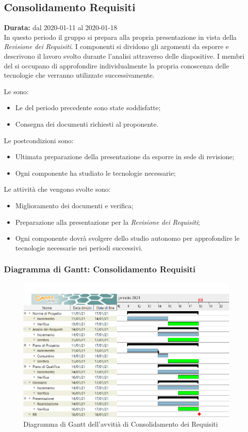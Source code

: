 \subsection{Consolidamento Requisiti}
\label{consolidamento_requisiti}
\textbf{Durata:} dal 2020-01-11 al 2020-01-18 \\
In questo periodo il gruppo si prepara alla propria presentazione in vista della \textit{Revisione dei Requisiti}.
I componenti si dividono gli argomenti da esporre e descrivono il lavoro svolto durante l'analisi attraverso delle diapositive.
I membri del  si occupano di approfondire individualmente la propria conoscenza delle tecnologie che verranno utilizzate successivamente.

Le  sono:
\begin{itemize}
    \item Le  del periodo precedente sono state soddisfatte;
    \item Consegna dei documenti richiesti al proponente.
\end{itemize}

Le postcondizioni sono:
\begin{itemize}
    \item Ultimata preparazione della presentazione da esporre in sede di revisione;
    \item Ogni componente ha studiato le tecnologie necessarie;
\end{itemize}
Le attività che vengono svolte sono:
\begin{itemize}
    \item Miglioramento dei documenti e verifica;
    \item Preparazione alla presentazione per la \textit{Revisione dei Requisiti};
    \item Ogni componente dovrà svolgere dello studio autonomo per approfondire le tecnologie necessarie nei periodi successivi.  
\end{itemize}

\newpage
\subsubsection{Diagramma di Gantt: Consolidamento Requisiti}
\begin{figure}[ht]
    \centering
    \includegraphics[width=\textwidth]{../../Immagini/GanttConsolidamentoRequisiti}
    \caption{Diagramma di Gantt dell'avvitià di Consolidamento dei Requisiti}
\end{figure}
